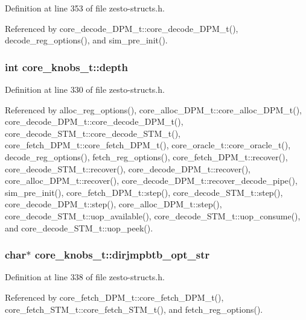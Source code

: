 Definition at line 353 of file zesto-structs.h.

Referenced by core\_\-decode\_\-DPM\_\-t::core\_\-decode\_\-DPM\_\-t(), decode\_\-reg\_\-options(), and sim\_\-pre\_\-init().
\subsubsection[{depth}]{\setlength{\rightskip}{0pt plus 5cm}int {\bf core\_\-knobs\_\-t::depth}}\label{structcore__knobs__t_0b2a5addcef411c228190e315c0ac716}




Definition at line 330 of file zesto-structs.h.

Referenced by alloc\_\-reg\_\-options(), core\_\-alloc\_\-DPM\_\-t::core\_\-alloc\_\-DPM\_\-t(), core\_\-decode\_\-DPM\_\-t::core\_\-decode\_\-DPM\_\-t(), core\_\-decode\_\-STM\_\-t::core\_\-decode\_\-STM\_\-t(), core\_\-fetch\_\-DPM\_\-t::core\_\-fetch\_\-DPM\_\-t(), core\_\-oracle\_\-t::core\_\-oracle\_\-t(), decode\_\-reg\_\-options(), fetch\_\-reg\_\-options(), core\_\-fetch\_\-DPM\_\-t::recover(), core\_\-decode\_\-STM\_\-t::recover(), core\_\-decode\_\-DPM\_\-t::recover(), core\_\-alloc\_\-DPM\_\-t::recover(), core\_\-decode\_\-DPM\_\-t::recover\_\-decode\_\-pipe(), sim\_\-pre\_\-init(), core\_\-fetch\_\-DPM\_\-t::step(), core\_\-decode\_\-STM\_\-t::step(), core\_\-decode\_\-DPM\_\-t::step(), core\_\-alloc\_\-DPM\_\-t::step(), core\_\-decode\_\-STM\_\-t::uop\_\-available(), core\_\-decode\_\-STM\_\-t::uop\_\-consume(), and core\_\-decode\_\-STM\_\-t::uop\_\-peek().
\subsubsection[{dirjmpbtb\_\-opt\_\-str}]{\setlength{\rightskip}{0pt plus 5cm}char$\ast$ {\bf core\_\-knobs\_\-t::dirjmpbtb\_\-opt\_\-str}}\label{structcore__knobs__t_728c63e6314e9ca1fe0ef36afab80b5a}




Definition at line 338 of file zesto-structs.h.

Referenced by core\_\-fetch\_\-DPM\_\-t::core\_\-fetch\_\-DPM\_\-t(), core\_\-fetch\_\-STM\_\-t::core\_\-fetch\_\-STM\_\-t(), and fetch\_\-reg\_\-options().
